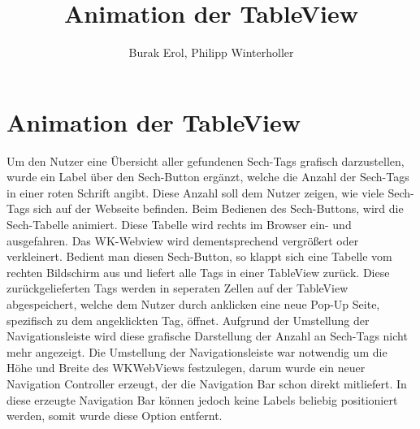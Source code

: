 
\title{Animation der TableView}
\author{Burak Erol, Philipp Winterholler}

\section{Animation der TableView}

Um den Nutzer eine Übersicht aller gefundenen Sech-Tags grafisch darzustellen, wurde ein Label über den Sech-Button ergänzt, welche die Anzahl der Sech-Tags in einer roten Schrift angibt. Diese Anzahl soll dem Nutzer zeigen, wie viele Sech-Tags sich auf der Webseite befinden. Beim Bedienen des Sech-Buttons, wird die Sech-Tabelle animiert. Diese Tabelle wird rechts im Browser ein- und ausgefahren. Das WK-Webview wird dementsprechend vergrößert oder verkleinert. Bedient man diesen Sech-Button, so klappt sich eine Tabelle vom rechten Bildschirm aus und liefert alle Tags in einer TableView zurück. Diese zurückgelieferten Tags werden in seperaten Zellen auf der TableView abgespeichert, welche dem Nutzer durch anklicken eine neue Pop-Up Seite, spezifisch zu dem angeklickten Tag, öffnet. Aufgrund der Umstellung der Navigationsleiste wird diese grafische Darstellung der Anzahl an Sech-Tags nicht mehr angezeigt. Die Umstellung der Navigationsleiste war notwendig um die Höhe und Breite des WKWebViews festzulegen, darum wurde ein neuer Navigation Controller erzeugt, der die Navigation Bar schon direkt mitliefert. In diese erzeugte Navigation Bar können jedoch keine Labels beliebig positioniert werden, somit wurde diese Option entfernt.

